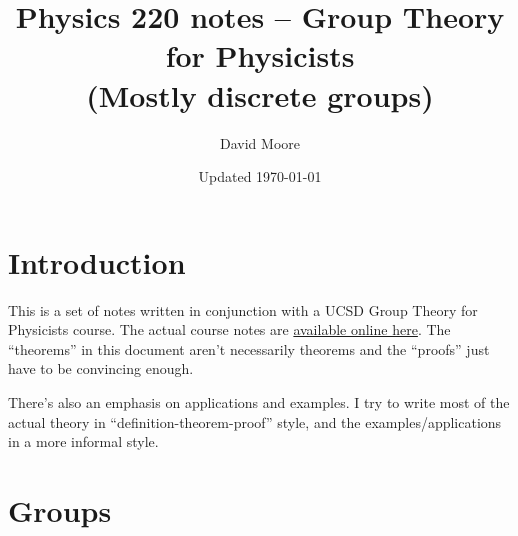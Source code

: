 \documentclass[12pt, letterpaper]{article}
\title{Physics 220 notes -- Group Theory for Physicists \\ (Mostly discrete groups)}
\author{David Moore}
\date{Updated \today}
\theoremstyle{definition} %
\begin{document}
\maketitle

\tableofcontents

\section*{Introduction}

This is a set of notes written in conjunction with a UCSD Group Theory 
for Physicists course.
The actual course notes are 
\href{https://wucj.physics.ucsd.edu/teach/Phy220_2018/phy220.html}{available online here}.
The ``theorems'' in this document aren't necessarily theorems and the ``proofs'' just have to 
be convincing enough. 

There's also an emphasis on applications and examples. I try to write most of the actual theory in 
``definition-theorem-proof'' style, and the examples/applications in a more informal style.


\section{Groups}
\end{document}
